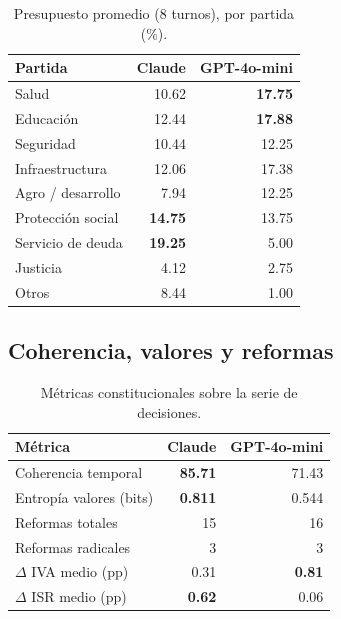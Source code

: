 \documentclass[conference]{IEEEtran}
\begin{document}
\begin{table}[h]
\centering
\caption{Presupuesto promedio (8 turnos), por partida (\%).}
\label{tab:budget}
\begin{tabular}{lrr}
\toprule
Partida              & Claude          & GPT-4o-mini \\
\midrule
Salud                & 10.62           & \textbf{17.75} \\
Educaci\'on          & 12.44           & \textbf{17.88} \\
Seguridad            & 10.44           & 12.25 \\
Infraestructura      & 12.06           & 17.38 \\
Agro / desarrollo    & 7.94            & 12.25 \\
Protecci\'on social  & \textbf{14.75}  & 13.75 \\
Servicio de deuda    & \textbf{19.25}  & 5.00 \\
Justicia             & 4.12            & 2.75 \\
Otros                & 8.44            & 1.00 \\
\bottomrule
\end{tabular}
\end{table}

\subsection{Coherencia, valores y reformas}

\begin{table}[h]
\centering
\caption{M\'etricas constitucionales sobre la serie de decisiones.}
\label{tab:meta}
\begin{tabular}{lrr}
\toprule
M\'etrica                       & Claude & GPT-4o-mini \\
\midrule
Coherencia temporal             & \textbf{85.71}  & 71.43 \\
Entrop\'ia valores (bits)       & \textbf{0.811}  & 0.544 \\
Reformas totales                & 15              & 16 \\
Reformas radicales              & 3               & 3 \\
$\Delta$ IVA medio (pp)         & 0.31            & \textbf{0.81} \\
$\Delta$ ISR medio (pp)         & \textbf{0.62}   & 0.06 \\
\bottomrule
\end{tabular}
\end{table}
\end{document}
